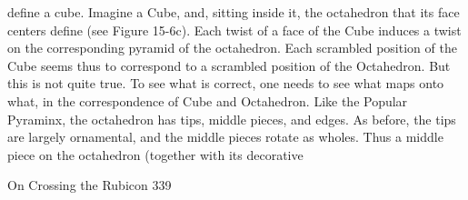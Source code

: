 define a cube.
        Imagine a Cube, and, sitting inside it, the octahedron that its face centers
define (see Figure 15-6c). Each twist of a face of the Cube induces a twist on the
corresponding pyramid of the octahedron. Each scrambled position of the Cube seems
thus to correspond to a scrambled position of the Octahedron. But this is not quite
true. To see what is correct, one needs to see what maps onto what, in the
correspondence of Cube and Octahedron. Like the Popular Pyraminx, the octahedron
has tips, middle pieces, and edges. As before, the tips are largely ornamental, and the
middle pieces rotate as wholes. Thus a middle piece on the octahedron (together with
its decorative




On Crossing the Rubicon                                                               339

